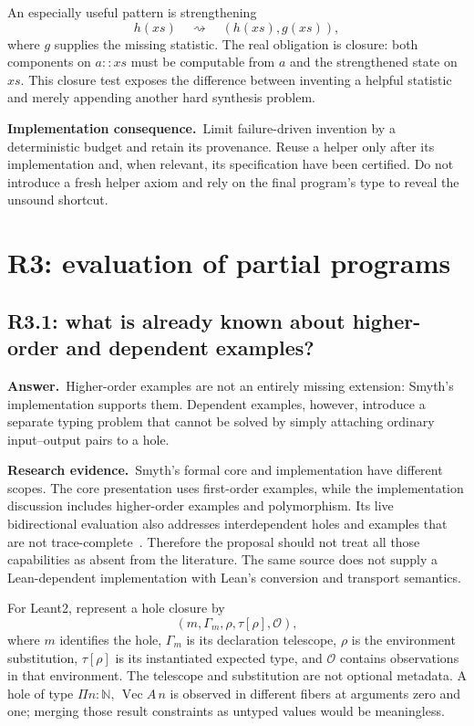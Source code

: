 \documentclass[11pt,a4paper]{article}
\theoremstyle{definition}
\theoremstyle{remark}
\newcommand{\Nat}{\mathbb N}
\newcommand{\ans}{\noindent\textbf{Answer.}\ }
\newcommand{\imp}{\par\noindent\textbf{Implementation consequence.}\ }
\newcommand{\lit}{\par\noindent\textbf{Research evidence.}\ }
\begin{document}
An especially useful pattern is strengthening
\[
 h(xs)\quad\rightsquigarrow\quad (h(xs),g(xs)),
\]
where $g$ supplies the missing statistic. The real obligation is closure:
both components on $a::xs$ must be computable from $a$ and the strengthened
state on $xs$. This closure test exposes the difference between inventing a
helpful statistic and merely appending another hard synthesis problem.

\imp Limit failure-driven invention by a deterministic budget and retain its
provenance. Reuse a helper only after its implementation and, when relevant,
its specification have been certified. Do not introduce a fresh helper axiom
and rely on the final program's type to reveal the unsound shortcut.

\section{R3: evaluation of partial programs}\label{sec:r3}

\subsection{R3.1: what is already known about higher-order and dependent examples?}\label{q:R3.1}
\ans Higher-order examples are not an entirely missing extension: Smyth's
implementation supports them. Dependent examples, however, introduce a
separate typing problem that cannot be solved by simply attaching ordinary
input--output pairs to a hole.

\lit Smyth's formal core and implementation have different scopes. The core
presentation uses first-order examples, while the implementation discussion
includes higher-order examples and polymorphism. Its live bidirectional
evaluation also addresses interdependent holes and examples that are not
trace-complete~\cite{smyth}. Therefore the proposal should not treat all those
capabilities as absent from the literature. The same source does not supply a
Lean-dependent implementation with Lean's conversion and transport semantics.

For Leant2, represent a hole closure by
\[
 (m,\Gamma_m,\rho,\tau[\rho],\mathcal O),
\]
where $m$ identifies the hole, $\Gamma_m$ is its declaration telescope, $\rho$
is the environment substitution, $\tau[\rho]$ is its instantiated expected
type, and $\mathcal O$ contains observations in that environment. The telescope
and substitution are not optional metadata. A hole of type
$\Pi n:\Nat,\,\operatorname{Vec}A\,n$ is observed in different fibers at
arguments zero and one; merging those result constraints as untyped values
would be meaningless.
\end{document}
